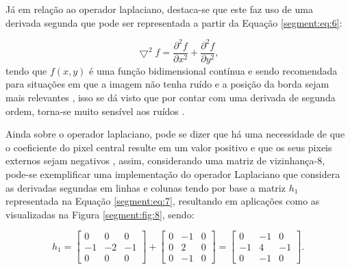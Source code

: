 Já em relação ao operador laplaciano, destaca-se que este faz uso de uma derivada segunda que pode ser representada a partir da Equação \ref{segment:eq:6}:

\begin{equation}
    \label{segment:eq:6}
    \bigtriangledown^2 f = \frac{\partial^2f}{\partial x^2} + \frac{\partial^2f}{\partial y^2},
\end{equation}
tendo que $f(x,y)$ é uma função bidimensional contínua e sendo recomendada para situações em que a imagem não tenha ruído e a posição da borda sejam mais relevantes \citep{Yuheng2017}, isso se dá visto que por contar com uma derivada de segunda ordem, torna-se muito sensível aos ruídos \citep{pedrini2008analise}.

Ainda sobre o operador laplaciano, pode se dizer que há uma necessidade de que o coeficiente do pixel central resulte em um valor positivo e que os seus pixeis externos sejam negativos \citep{pedrini2008analise}, assim, considerando uma matriz de vizinhança-8, pode-se exemplificar uma implementação do operador Laplaciano que considera as derivadas segundas em linhas e colunas tendo por base a matriz $h_1$ representada na Equação \ref{segment:eq:7}, resultando em aplicações como as visualizadas na Figura \ref{segment:fig:8}, sendo: 

\begin{equation}
    \label{segment:eq:7}
    h_1 = \begin{bmatrix}
     0 &  0 &  0 \\ 
    -1 & -2 & -1 \\ 
     0 &  0 &  0
    \end{bmatrix} +
    \begin{bmatrix}
     0 & -1 & 0 \\ 
     0 &  2 & 0 \\ 
     0 & -1 & 0 
    \end{bmatrix} =
    \begin{bmatrix}
     0 & -1 & 0 \\ 
    -1 &  4 & -1 \\ 
     0 & -1 & 0 
    \end{bmatrix}.
\end{equation}

